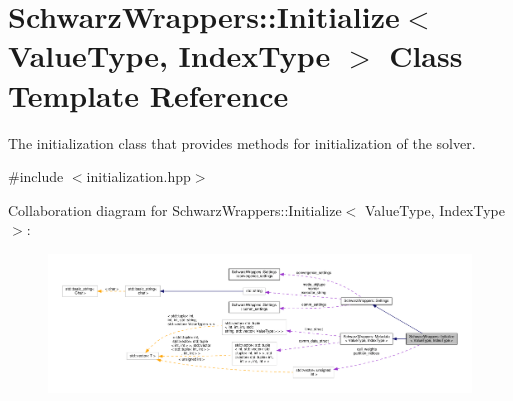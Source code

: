 \hypertarget{classSchwarzWrappers_1_1Initialize}{}\section{Schwarz\+Wrappers\+:\+:Initialize$<$ Value\+Type, Index\+Type $>$ Class Template Reference}
\label{classSchwarzWrappers_1_1Initialize}


The initialization class that provides methods for initialization of the solver.  




{\ttfamily \#include $<$initialization.\+hpp$>$}



Collaboration diagram for Schwarz\+Wrappers\+:\+:Initialize$<$ Value\+Type, Index\+Type $>$\+:
\nopagebreak
\begin{figure}[H]
\begin{center}
\leavevmode
\includegraphics[width=350pt]{classSchwarzWrappers_1_1Initialize__coll__graph}
\end{center}
\end{figure}
